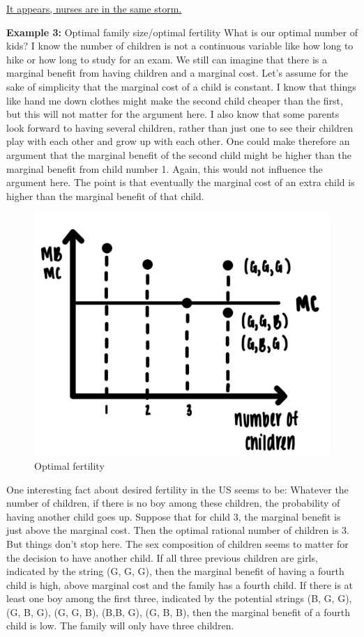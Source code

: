 \documentclass[
]{book}
\begin{document}
\href{https://www.npr.org/2020/11/18/936096303/nurses-are-under-pressure-as-hospitals-strain-to-meet-pandemic-demands}{It appears, nurses are in the same storm.}

\textbf{Example 3:} Optimal family size/optimal fertility
What is our optimal number of kids? I know the number of children is not a continuous variable like how long to hike or how long to study for an exam. We still can imagine that there is a marginal benefit from having children and a marginal cost. Let's assume for the sake of simplicity that the marginal cost of a child is constant. I know that things like hand me down clothes might make the second child cheaper than the first, but this will not matter for the argument here. I also know that some parents look forward to having several children, rather than just one to see their children play with each other and grow up with each other. One could make therefore an argument that the marginal benefit of the second child might be higher than the marginal benefit from child number 1. Again, this would not influence the argument here. The point is that eventually the marginal cost of an extra child is higher than the marginal benefit of that child.

\begin{figure}

{\centering \includegraphics[width=0.5\linewidth]{img/ch2/fig8} 

}

\caption{Optimal fertility}\label{fig:fig208}
\end{figure}

One interesting fact about desired fertility in the US seems to be: Whatever the number of children, if there is no boy among these children, the probability of having another child goes up. Suppose that for child 3, the marginal benefit is just above the marginal cost. Then the optimal rational number of children is 3. But things don't stop here. The sex composition of children seems to matter for the decision to have another child. If all three previous children are girls, indicated by the string (G, G, G), then the marginal benefit of having a fourth child is high, above marginal cost and the family has a fourth child. If there is at least one boy among the first three, indicated by the potential strings (B, G, G), (G, B, G), (G, G, B), (B,B, G), (G, B, B), then the marginal benefit of a fourth child is low. The family will only have three children.
\end{document}
